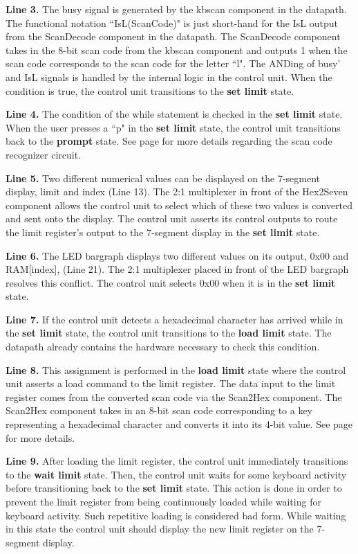 \textbf{ Line 3.} The busy signal is generated by the kbscan component in the datapath.  
The functional notation ``IsL(ScanCode)" is just short-hand for the IsL output from 
the ScanDecode component in the datapath.  The ScanDecode component takes in the
8-bit scan code from the kbscan component and outputs 1 when the scan code corresponds
to the scan code for the letter ``l".  The ANDing of busy' and IsL signals is handled 
by the internal logic in the control unit.  When the condition is true, the control 
unit transitions to the \textbf{ set limit} state.

\textbf{ Line 4.} The condition of the while statement is checked in the \textbf{ set limit} 
state.  When the user presses a ``p" in the \textbf{ set limit} state, the control 
unit transitions back to the \textbf{ prompt} state.  See page \pageref{page:IsScan}
for more details regarding the scan code recognizer circuit.

\textbf{ Line 5.} Two different numerical values can be displayed on the 
7-segment display, limit and index (Line 13).  The 2:1 multiplexer in front of 
the Hex2Seven component allows the control unit to select which of these two values is 
converted and sent onto the display.  The control unit asserts its control 
outputs to route the limit register's output to the 7-segment display in 
the \textbf{ set limit} state.

\textbf{ Line 6.} The LED bargraph displays two different values on its output, 0x00 and 
RAM[index], (Line 21).  The 2:1 multiplexer placed in front of the LED bargraph 
resolves this conflict.  The control unit selects 0x00 when it is in the 
\textbf{ set limit} state.

\textbf{ Line 7.} If the control unit detects a hexadecimal character has arrived while 
in the \textbf{ set limit} state, the control unit transitions to the \textbf{ load 
limit} state.  The datapath already contains the hardware necessary to check 
this condition.

\textbf{ Line 8.} This assignment is performed in the \textbf{ load limit} state where the control 
unit asserts a load command to the limit register.  The data input to the limit 
register comes from the converted scan code via the Scan2Hex component.  The Scan2Hex
component takes in an 8-bit scan code corresponding to a key representing a hexadecimal
character and converts it into its 4-bit value. See page \pageref{page:ScanDecode}
for more details.

\textbf{ Line 9.}  After loading the limit register, the control unit immediately transitions 
to the \textbf{ wait limit} state.  Then, the control unit waits for some keyboard activity 
before transitioning back to the \textbf{ set limit} state.  This action is done in order to prevent 
the limit register from being continuously loaded while waiting for keyboard activity.
Such repetitive loading is considered bad form.  While waiting in this state the control 
unit should display the new limit register on the 7-segment display.

